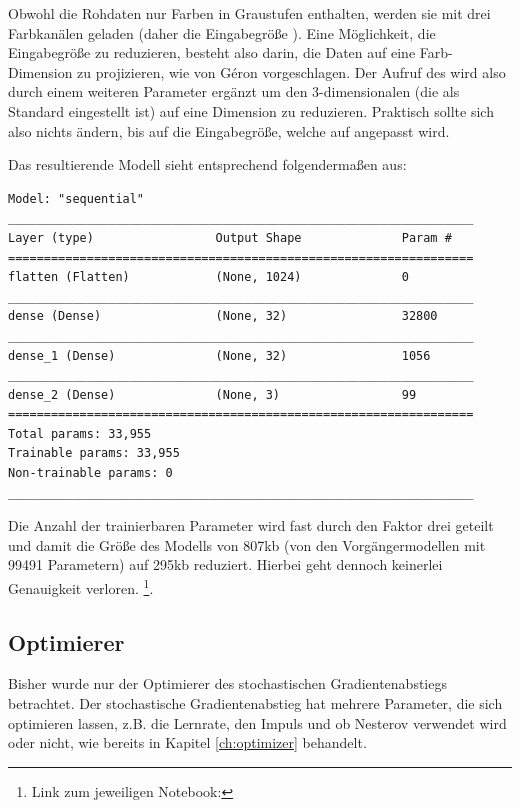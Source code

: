 Obwohl die Rohdaten nur Farben in Graustufen enthalten, werden sie mit drei Farbkanälen geladen (daher die Eingabegröße \code{[32, 32, 3]}).
Eine Möglichkeit, die Eingabegröße zu reduzieren, besteht also darin, die Daten auf eine Farb-Dimension zu projizieren, wie von Géron \cite[S.215]{Geron2019} vorgeschlagen.
Der Aufruf des  wird also durch einem weiteren Parameter  ergänzt um den 3-dimensionalen  (die als Standard eingestellt ist) auf eine Dimension zu reduzieren.
Praktisch sollte sich also nichts ändern, bis auf die Eingabegröße, welche auf \code{[32, 32, 1]} angepasst wird.

Das resultierende Modell sieht entsprechend folgendermaßen aus:

\begin{lstlisting}[caption={Summary des verbesserten Modells.}]
Model: "sequential"
_________________________________________________________________
Layer (type)                 Output Shape              Param #   
=================================================================
flatten (Flatten)            (None, 1024)              0         
_________________________________________________________________
dense (Dense)                (None, 32)                32800     
_________________________________________________________________
dense_1 (Dense)              (None, 32)                1056      
_________________________________________________________________
dense_2 (Dense)              (None, 3)                 99        
=================================================================
Total params: 33,955
Trainable params: 33,955
Non-trainable params: 0
_________________________________________________________________
\end{lstlisting}

Die Anzahl der trainierbaren Parameter wird fast durch den Faktor drei geteilt und damit die Größe des Modells von 807kb (von den Vorgängermodellen mit 99491 Parametern) auf 295kb reduziert.
Hierbei geht dennoch keinerlei Genauigkeit verloren. \footnote{Link zum jeweiligen Notebook: }.

\subsection{Optimierer}

Bisher wurde nur der Optimierer des stochastischen Gradientenabstiegs betrachtet.
Der stochastische Gradientenabstieg hat mehrere Parameter, die sich optimieren lassen, z.B. die Lernrate, den Impuls und ob Nesterov verwendet wird oder nicht, wie bereits in Kapitel \ref{ch:optimizer} behandelt.

